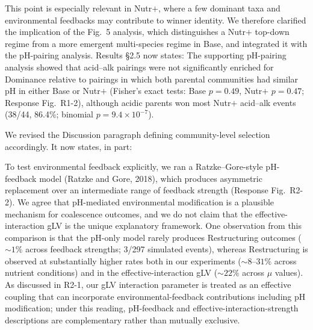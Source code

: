 This point is especially relevant in Nutr$+$, where a few dominant taxa and environmental feedbacks may contribute to winner identity. We therefore clarified the implication of the Fig.~5 analysis, which distinguishes a Nutr$+$ top-down regime from a more emergent multi-species regime in Base, and integrated it with the pH-pairing analysis. Results \S2.5 now states:  The supporting pH-pairing analysis showed that acid--alk pairings were not significantly enriched for Dominance relative to pairings in which both parental communities had similar pH in either Base or Nutr$+$ (Fisher's exact tests: Base $p = 0.49$, Nutr$+$ $p = 0.47$; Response Fig.~R1-2), although acidic parents won most Nutr$+$ acid--alk events (38/44, 86.4\%; binomial $p = 9.4 \times 10^{-7}$).

We revised the Discussion paragraph defining community-level selection accordingly. It now states, in part: 

To test environmental feedback explicitly, we ran a Ratzke--Gore-style pH-feedback model (Ratzke and Gore, 2018), which produces asymmetric replacement over an intermediate range of feedback strength (Response Fig.~R2-2). We agree that pH-mediated environmental modification is a plausible mechanism for coalescence outcomes, and we do not claim that the effective-interaction gLV is the unique explanatory framework. One observation from this comparison is that the pH-only model rarely produces Restructuring outcomes ($\sim 1\%$ across feedback strengths; 3/297 simulated events), whereas Restructuring is observed at substantially higher rates both in our experiments ($\sim 8\text{--}31\%$ across nutrient conditions) and in the effective-interaction gLV ($\sim 22\%$ across $\mu$ values). As discussed in R2-1, our gLV interaction parameter is treated as an effective coupling that can incorporate environmental-feedback contributions including pH modification; under this reading, pH-feedback and effective-interaction-strength descriptions are complementary rather than mutually exclusive.

